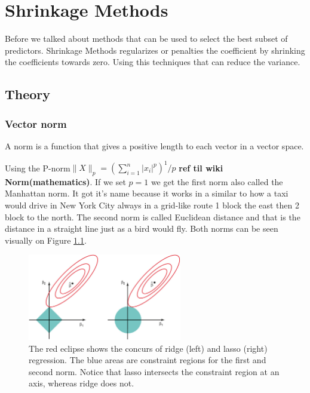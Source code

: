 \chapter{Shrinkage Methods} \label{ch:shrinkageMethods}
Before we talked about methods that can be used to select the best subset of predictors. Shrinkage Methods regularizes or penalties the coefficient by shrinking the coefficients towards zero. Using this techniques that can reduce the variance. 

\section{Theory}
\subsection{Vector norm}
A norm is a function that gives a positive length to each vector in a vector space.

\noindent Using the P-norm$ \lVert X \rVert_p = ( \sum_{i=1}^{n}|x_i|^p  )^1/p $ \textbf{ref til wiki Norm(mathematics)}. If we set $ p = 1 $ we get the first norm also called the Manhattan norm. It got it's name because it works in a similar to how a taxi would drive in New York City always in a grid-like route 1 block the east then 2 block to the north. The second norm is called Euclidean distance and that is the distance in a straight line just as a bird would fly. Both norms can be seen visually on Figure \ref{fig:normfirstsecond}.

\begin{figure}[H]
	\centering
	\includegraphics[width=0.6\textwidth]{shrinkageMethods/fig/normsL1_L2.jpg}
	\caption{The red eclipse shows the concurs of ridge (left) and lasso (right) regression. The blue areas are constraint regions for the first and second norm. Notice that lasso intersects the constraint region at an axis, whereas ridge does not.}
	\label{fig:normfirstsecond}
\end{figure}

